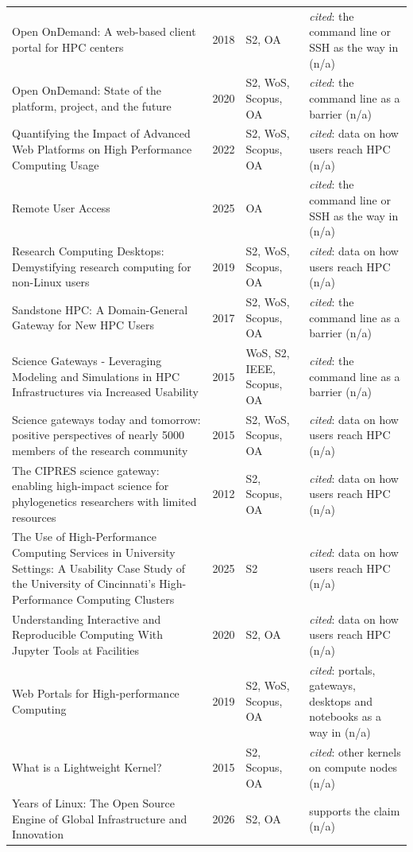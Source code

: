 \begin{longtable}{@{}%
  >{\raggedright\arraybackslash}p{}c%
  >{\raggedright\arraybackslash}p{}%
  >{\raggedright\arraybackslash}p{}@{}}
Open OnDemand: A web-based client portal for HPC centers & 2018 & S2, OA & \emph{cited}: the command line or SSH as the way in (n/a) \\
Open OnDemand: State of the platform, project, and the future & 2020 & S2, WoS, Scopus, OA & \emph{cited}: the command line as a barrier (n/a) \\
Quantifying the Impact of Advanced Web Platforms on High Performance Computing Usage & 2022 & S2, WoS, Scopus, OA & \emph{cited}: data on how users reach HPC (n/a) \\
Remote User Access & 2025 & OA & \emph{cited}: the command line or SSH as the way in (n/a) \\
Research Computing Desktops: Demystifying research computing for non-Linux users & 2019 & S2, WoS, Scopus, OA & \emph{cited}: data on how users reach HPC (n/a) \\
Sandstone HPC: A Domain-General Gateway for New HPC Users & 2017 & S2, WoS, Scopus, OA & \emph{cited}: the command line as a barrier (n/a) \\
Science Gateways - Leveraging Modeling and Simulations in HPC Infrastructures via Increased Usability & 2015 & WoS, S2, IEEE, Scopus, OA & \emph{cited}: the command line as a barrier (n/a) \\
Science gateways today and tomorrow: positive perspectives of nearly 5000 members of the research community & 2015 & S2, WoS, Scopus, OA & \emph{cited}: data on how users reach HPC (n/a) \\
The CIPRES science gateway: enabling high-impact science for phylogenetics researchers with limited resources & 2012 & S2, Scopus, OA & \emph{cited}: data on how users reach HPC (n/a) \\
The Use of High-Performance Computing Services in University Settings: A Usability Case Study of the University of Cincinnati's High-Performance Computing Clusters & 2025 & S2 & \emph{cited}: data on how users reach HPC (n/a) \\
Understanding Interactive and Reproducible Computing With Jupyter Tools at Facilities & 2020 & S2, OA & \emph{cited}: data on how users reach HPC (n/a) \\
Web Portals for High-performance Computing & 2019 & S2, WoS, Scopus, OA & \emph{cited}: portals, gateways, desktops and notebooks as a way in (n/a) \\
What is a Lightweight Kernel? & 2015 & S2, Scopus, OA & \emph{cited}: other kernels on compute nodes (n/a) \\
35 Years of Linux: The Open Source Engine of Global Infrastructure and Innovation & 2026 & S2, OA & supports the claim (n/a) \\

\end{longtable}
